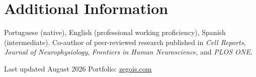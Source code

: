 \documentclass[10pt,a4paper]{article}
\begin{document}
\section{Additional Information}
Portuguese (native), English (professional working proficiency), Spanish (intermediate). Co-author of peer-reviewed research published in \textit{Cell Reports}, \textit{Journal of Neurophysiology}, \textit{Frontiers in Human Neuroscience}, and \textit{PLOS ONE}.

\vfill
{\footnotesize\color{muted}Last updated August 2026 \textbullet{} Portfolio: \href{https://zegois.com}{zegois.com}}
\end{document}
